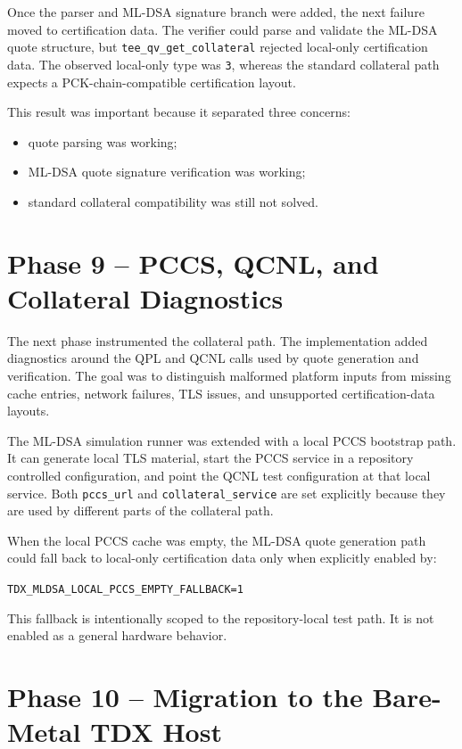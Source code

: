Once the parser and ML-DSA signature branch were added, the next failure moved
to certification data. The verifier could parse and validate the ML-DSA quote
structure, but \texttt{tee\_qv\_get\_collateral} rejected local-only
certification data. The observed local-only type was \texttt{3}, whereas the
standard collateral path expects a PCK-chain-compatible certification layout.

This result was important because it separated three concerns:

\begin{itemize}
  \item quote parsing was working;
  \item ML-DSA quote signature verification was working;
  \item standard collateral compatibility was still not solved.
\end{itemize}

\section{Phase 9 -- PCCS, QCNL, and Collateral Diagnostics}

The next phase instrumented the collateral path. The implementation added
diagnostics around the QPL and QCNL calls used by quote generation and
verification. The goal was to distinguish malformed platform inputs from
missing cache entries, network failures, TLS issues, and unsupported
certification-data layouts.

The ML-DSA simulation runner was extended with a local PCCS bootstrap path.
It can generate local TLS material, start the PCCS service in a repository
controlled configuration, and point the QCNL test configuration at that local
service. Both \texttt{pccs\_url} and \texttt{collateral\_service} are set
explicitly because they are used by different parts of the collateral path.

When the local PCCS cache was empty, the ML-DSA quote generation path could
fall back to local-only certification data only when explicitly enabled by:

\begin{center}
\texttt{TDX\_MLDSA\_LOCAL\_PCCS\_EMPTY\_FALLBACK=1}
\end{center}

This fallback is intentionally scoped to the repository-local test path. It is
not enabled as a general hardware behavior.

\section{Phase 10 -- Migration to the Bare-Metal TDX Host}

